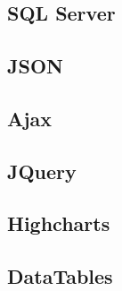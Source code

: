 \section{}
\subsection{SQL Server}
\subsection{JSON}
\subsection{Ajax}
\subsection{JQuery}
\subsection{Highcharts}
\subsection{DataTables}

